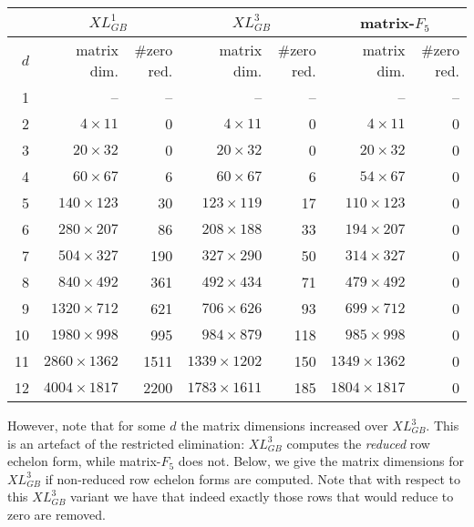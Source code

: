 \begin{center}
\begin{tabular}{|r|r|r|r|r|r|r|}
\hline
& \multicolumn{2}{|c|}{$XL_{GB}^1$} & \multicolumn{2}{|c|}{$XL_{GB}^3$} &
\multicolumn{2}{|c|}{matrix-$F_5$}\\
\hline
$d$ & matrix dim. & \#zero red.& matrix dim. & \#zero red. & matrix dim.
& \#zero red.\\
\hline
 1&               --&  --&               --&  --&                --&--\\
 2&$   4\times   11$&   0&$   4\times   11$&   0&$   4\times   11$ &0\\
 3&$  20\times   32$&   0&$  20\times   32$&   0&$  20\times   32$ &0\\
 4&$  60\times   67$&   6&$  60\times   67$&   6&$  54\times   67$ &0\\
 5&$ 140\times  123$&  30&$ 123\times  119$&  17&$ 110\times  123$ &0\\
 6&$ 280\times  207$&  86&$ 208\times  188$&  33&$ 194\times  207$ &0\\
 7&$ 504\times  327$& 190&$ 327\times  290$&  50&$ 314\times  327$ &0\\
 8&$ 840\times  492$& 361&$ 492\times  434$&  71&$ 479\times  492$ &0\\
 9&$1320\times  712$& 621&$ 706\times  626$&  93&$ 699\times  712$ &0\\
10&$1980\times  998$& 995&$ 984\times  879$& 118&$ 985\times  998$ &0\\
11&$2860\times 1362$&1511&$1339\times 1202$& 150&$1349\times 1362$ &0\\
12&$4004\times 1817$&2200&$1783\times 1611$& 185&$1804\times 1817$ &0\\
\hline
\end{tabular}
\end{center}

However, note that for some $d$ the matrix dimensions increased over $XL_{GB}^3$. This is an artefact of the restricted elimination: $XL_{GB}^3$ computes the \emph{reduced} row echelon form, while matrix-$F_5$ does not. Below, we give the matrix dimensions for $XL_{GB}^3$ if non-reduced row echelon forms are computed. Note that with respect to this $XL_{GB}^3$ variant we have that indeed exactly those rows that would reduce to zero are removed.

